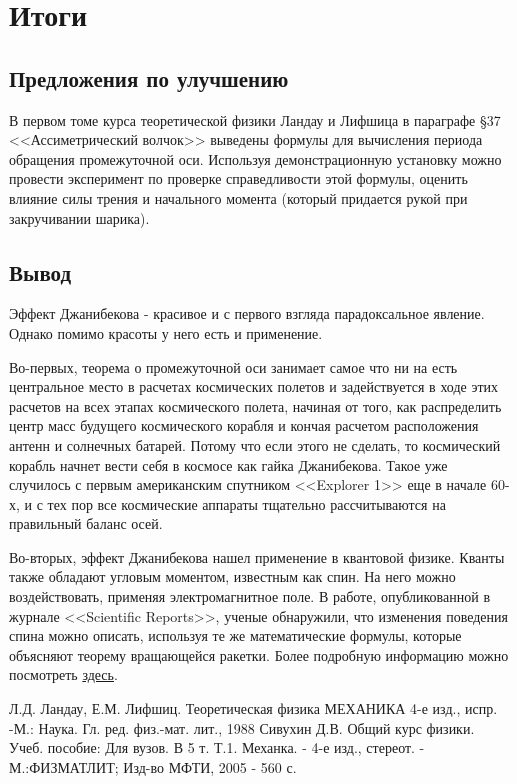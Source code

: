 \documentclass{article}
\begin{document}
\section{Итоги}
\subsection{Предложения по улучшению}
В первом томе курса теоретической физики Ландау и Лифшица в параграфе §37 <<Ассиметрический волчок>> выведены формулы для вычисления периода обращения промежуточной оси. Используя демонстрационную установку можно провести эксперимент по проверке справедливости этой формулы, оценить влияние силы трения и начального момента (который придается рукой при закручивании шарика). 
\subsection{Вывод}
Эффект Джанибекова - красивое и с первого взгляда парадоксальное явление. Однако помимо красоты у него есть и применение. 
\par
Во-первых, теорема о промежуточной оси занимает самое что ни на есть центральное место в расчетах космических полетов и задействуется в ходе этих расчетов на всех этапах космического полета, начиная от того, как распределить центр масс будущего космического корабля и кончая расчетом расположения антенн и солнечных батарей. Потому что если этого не сделать, то космический корабль начнет вести себя в космосе как гайка Джанибекова. Такое уже случилось с первым американским спутником <<Explorer 1>> еще в начале 60-х, и с тех пор все космические аппараты тщательно рассчитываются на правильный баланс осей.
\par
Во-вторых, эффект Джанибекова нашел применение в квантовой физике. Кванты также обладают угловым моментом, известным как спин. На него можно воздействовать, применяя электромагнитное поле. В работе, опубликованной в журнале <<Scientific Reports>>, ученые обнаружили, что изменения поведения спина можно описать, используя те же математические формулы, которые объясняют теорему вращающейся ракетки. Более подробную информацию можно посмотреть \href{https://www.nature.com/articles/s41598-017-04174-x}{здесь}.

\begin{thebibliography}{9}
Л.Д. Ландау, Е.М. Лифшиц. Теоретическая физика
МЕХАНИКА
4-е изд., испр. -М.: Наука. Гл. ред. физ.-мат. лит., 1988
Сивухин Д.В. Общий курс физики. Учеб. пособие: Для вузов. В 5 т. Т.1. Механка. - 4-е изд., стереот. - М.:ФИЗМАТЛИТ; Изд-во МФТИ, 2005 - 560 с.
\end{thebibliography}
\end{document}
